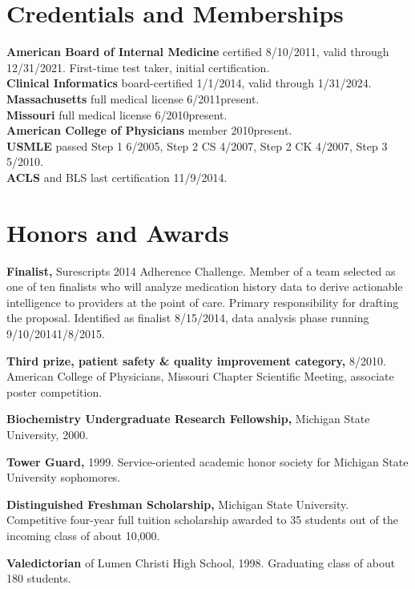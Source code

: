 \documentclass[12pt]{article}
\begin{document}

\section*{Credentials and Memberships}

\textbf{American Board of Internal Medicine} certified 8/10/2011,
valid through 12/31/2021. First-time test taker, initial
certification.\\
\textbf{Clinical Informatics} board-certified 1/1/2014, valid through
1/31/2024.\\
\textbf{Massachusetts} full medical license 6/2011\ndash{}present.\\
\textbf{Missouri} full medical license 6/2010\ndash{}present.\\
\textbf{American College of Physicians} member 2010\ndash{}present.\\
\textbf{USMLE} passed Step 1 6/2005, Step 2 CS 4/2007, Step 2 CK 4/2007, Step 3
5/2010.\\
\textbf{ACLS} and BLS last certification 11/9/2014.

\section*{Honors and Awards}

\textbf{Finalist,} Surescripts 2014 Adherence Challenge. Member of a
team selected as one of ten finalists who will analyze medication
history data to derive actionable intelligence to providers at the
point of care. Primary responsibility for drafting the proposal.
Identified as finalist 8/15/2014, data analysis phase running
9/10/2014\ndash{}1/8/2015.

\textbf{Third prize, patient safety \& quality improvement category,} 8/2010.
American College of Physicians, Missouri Chapter Scientific Meeting,
associate poster competition.

\textbf{Biochemistry Undergraduate Research Fellowship,} Michigan State
University, 2000.

\textbf{Tower Guard,} 1999. Service-oriented academic honor
society for Michigan State University sophomores.

\textbf{Distinguished Freshman Scholarship,} Michigan State
University. Competitive four-year full tuition scholarship awarded to
35 students out of the incoming class of about 10,000.

\textbf{Valedictorian} of Lumen Christi High School, 1998. Graduating
class of about 180 students.
\end{document}
